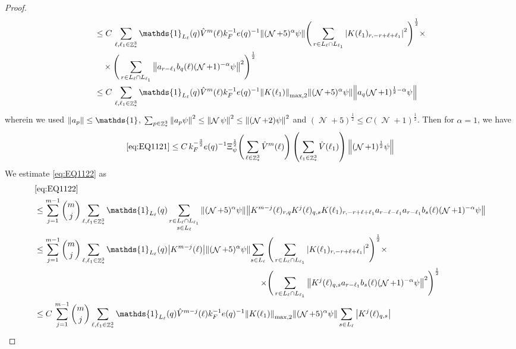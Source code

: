 \documentclass[sn-mathphys, Numbered ,a4paper]{sn-jnl}%
\DeclareMathOperator{\Z}{\mathbb{Z}}
\DeclareMathOperator{\NN}{\mathcal{N}}
\newcommand{\half}{\frac{1}{2}}
\theoremstyle{plain}
\theoremstyle{definition}
\theoremstyle{remark}
\theoremstyle{plain}
\theoremstyle{definition}
\theoremstyle{remark}
\begin{document}
\begin{proof}
\begin{align}
	 &\leq C\, \sum\limits_{\ell, \ell_1\in \Z^3_*} \mathds{1}_{L_{\ell}}(q) \hat{V}^{m}(\ell)  k_F^{-1}e(q)^{-1} \norm{  (\NN+5)^{\alpha} \psi} \Bigg( \sum\limits_{r\in L_{\ell} \cap L_{\ell_1}}  \abs{ K(\ell_1)_{r,-r+\ell+\ell_1}}^2 \Bigg)^\half \times \nonumber\\ &\quad\times\Bigg( \sum\limits_{r\in L_{\ell} \cap L_{\ell_1}} \norm{ a_{r-\ell_1} b_{q}(\ell) (\NN+1)^{-\alpha} \psi }^2 \Bigg)^\half \nonumber\\
	 &\leq C\,\sum\limits_{\ell, \ell_1\in \Z^3_*} \mathds{1}_{L_{\ell}}(q) \hat{V}^{m}(\ell)  k_F^{-1}e(q)^{-1} \norm{K(\ell_1) }_{\mathrm{max,2}}    \norm{(\NN+5)^{\alpha} \psi} \norm{ a_q (\NN+1)^{\half-\alpha} \psi } \nonumber
\end{align}
wherein we used $\norm{a_p} \leq \mathds{1}$, $\sum_{p\in \Z^3_*}\norm{a_p \psi}^2\leq\norm{\NN\psi}^2\leq \norm{(\NN+2)\psi}^2$ and $(\NN+5)^\half\leq C(\NN+1)^\half$. Then for $\alpha = 1$, we have
\begin{equation}
	\eqref{eq:EQ1121}\leq C\, k_F^{-\frac{3}{2}}e(q)^{-1}\Xi_{\psi}^\half \Bigg( \sum\limits_{\ell\in \Z^3_*} \hat{V}^{m}(\ell) \Bigg) \left(\sum\limits_{\ell_1\in \Z^3_*} \hat{V}(\ell_1) \right) \norm{(\NN+1)^\half \psi} \label{eq:estEQ1121}
\end{equation} 
We estimate \eqref{eq:EQ1122} as
\begin{alignat}{2}
	&\eqref{eq:EQ1122}\nonumber\\
	&\leq \sum\limits_{j=1}^{m-1} {{m}\choose j}\sum\limits_{\ell, \ell_1\in \Z^3_*} \mathds{1}_{L_{\ell}}(q) \sum\limits_{\substack{r\in L_{\ell} \cap L_{\ell_1}\\s\in L_{\ell}}} \norm{  (\NN+5)^{\alpha} \psi}\norm{  K^{m-j}(\ell)_{r,q} K^{j}(\ell)_{q,s} K(\ell_1)_{r,-r+\ell+\ell_1} a_{r-\ell-\ell_1} a_{r-\ell_1} b_{s}(\ell)  (\NN+1)^{-\alpha} \psi }\nonumber\\
	&\leq \sum\limits_{j=1}^{m-1} {{m}\choose j}\sum\limits_{\ell, \ell_1\in \Z^3_*} \mathds{1}_{L_{\ell}}(q) \abs{K^{m-j}(\ell)} \norm{ (\NN+5)^{\alpha} \psi} \begin{aligned}[t] \sum\limits_{s\in L_{\ell}} 
		\Bigg(&\sum\limits_{r\in L_{\ell} \cap L_{\ell_1}}\abs{K(\ell_1)_{r,-r+\ell+\ell_1} }^2\Bigg)^\half \times\nonumber\\ 
		\times\Bigg( &\sum\limits_{r\in L_{\ell} \cap L_{\ell_1}}\norm{K^{j}(\ell)_{q,s} a_{r-\ell_1} b_{s}(\ell)  (\NN+1)^{-\alpha} \psi }^2 \Bigg)^\half		
	\end{aligned}\nonumber\\
	&\leq C\,\sum\limits_{j=1}^{m-1} {{m}\choose j}\sum\limits_{\ell, \ell_1\in \Z^3_*} \mathds{1}_{L_{\ell}}(q) \hat{V}^{m-j}(\ell)k_F^{-1}e(q)^{-1} \norm{K(\ell_1)}_{\mathrm{max,2}} \norm{ (\NN+5)^{\alpha} \psi} \sum\limits_{s\in L_{\ell}}\abs{K^{j}(\ell)_{q,s}}

\end{alignat}
\end{proof}
\end{document}
